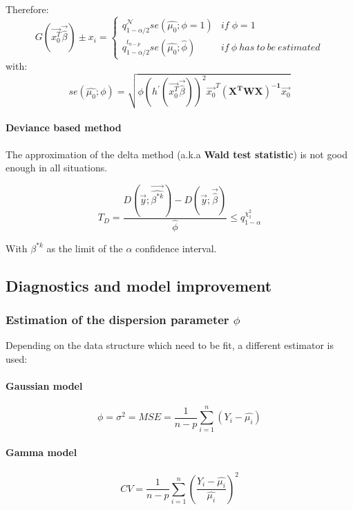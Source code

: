 Therefore:
\begin{equation*}
G(\vec{x_0^T}\vec{\hat{\beta}}) \pm x_i = \begin{cases}
q^\mathcal{N}_{1-\alpha/2}se(\hat{\mu_0};\phi=1) & if\; \phi = 1 \\
q^{t_{n-p}}_{1-\alpha/2}se(\hat{\mu_0};\hat {\phi}) & if\: \phi\: has\: to\: be\: estimated
\end{cases}
\end{equation*}
with:
\begin{equation*}
se(\hat{\mu_0};\phi) = \sqrt{\phi \left(h^{'}(\vec{x_0^T}\vec{\hat{\beta}})\right)^2 \vec{x_0}^T\bm{(X^TWX)^{-1}}\vec{x_0}}
\end{equation*}

\paragraph{Deviance based method}
The approximation of the delta method (a.k.a \textbf{Wald test statistic}) is not good enough in all situations.

\begin{equation*}
T_D = \frac{D(\vec{y};\vec{\hat{\beta^{*k}}})-D(\vec{y};\vec{\hat{\beta}})}{\hat{\phi}} \leq q^{\chi^2_1}_{1-\alpha}
\end{equation*}

With $\beta^{*k}$ as the limit of the $\alpha$ confidence interval.

\subsection{Diagnostics and model improvement}

\subsubsection{Estimation of the dispersion parameter $\phi$}

Depending on the data structure which need to be fit, a different estimator is used:

\paragraph{Gaussian model}
\begin{equation*}
\phi = \sigma^2 = MSE = \frac{1}{n-p}\sum_{i=1}^{n}(Y_i - \hat{\mu_i})
\end{equation*}

\paragraph{Gamma model}
\begin{equation*}
CV = \frac{1}{n-p}\sum_{i=1}^{n}\left(\frac{Y_i-\hat{\mu_i}}{\hat{\mu_i}}\right)^2
\end{equation*}

